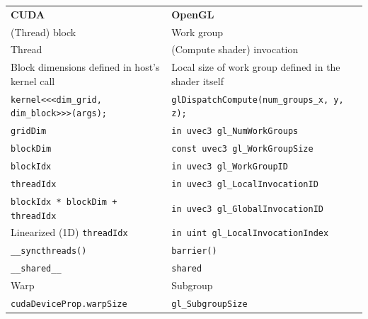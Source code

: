 \documentclass[table, xcdraw]{article}%
\begin{document}
\begin{table}[h!]
\begin{tabular}{ll}
\textbf{CUDA}                                        & \textbf{OpenGL}                                       \\
(Thread) block                                       & Work group                                            \\
Thread                                               & (Compute shader) invocation                           \\
Block dimensions defined in host's kernel call       & Local size of work group defined in the shader itself \\
\texttt{kernel<<<dim_grid, dim_block>>>(args);} & \texttt{glDispatchCompute(num_groups_x, y, z);}  \\
\texttt{gridDim}                                & \texttt{in uvec3 gl_NumWorkGroups}               \\
\texttt{blockDim}                               & \texttt{const uvec3 gl_WorkGroupSize}            \\
\texttt{blockIdx}                               & \texttt{in uvec3 gl_WorkGroupID}                 \\
\texttt{threadIdx}                              & \texttt{in uvec3 gl_LocalInvocationID}           \\
\texttt{blockIdx * blockDim + threadIdx}        & \texttt{in uvec3 gl_GlobalInvocationID}          \\
Linearized (1D) \texttt{threadIdx}              & \texttt{in uint gl_LocalInvocationIndex}         \\
\texttt{__syncthreads()}                        & \texttt{barrier()}                               \\
\texttt{__shared__}                             & \texttt{shared}                                  \\
Warp                                                 & Subgroup                                              \\
\texttt{cudaDeviceProp.warpSize}                & \texttt{gl_SubgroupSize}                                              
\end{tabular}
\end{table}
\end{document}
